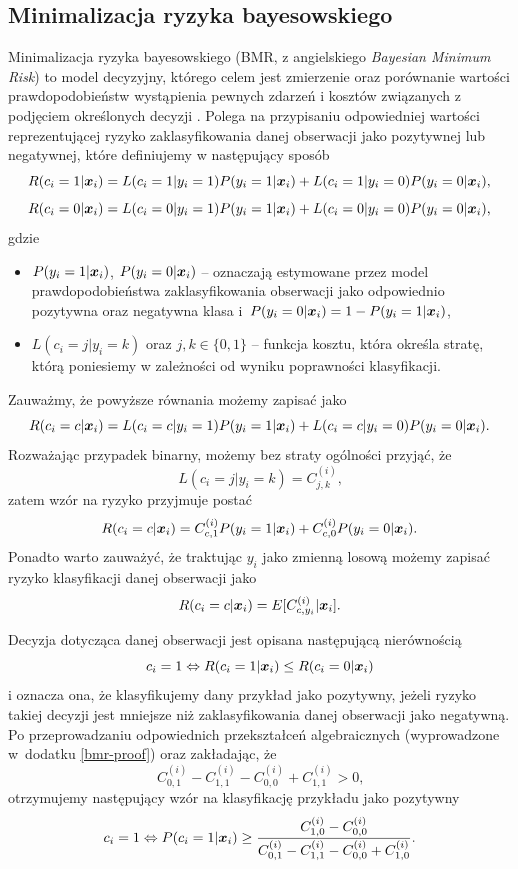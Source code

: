 \documentclass[inzynierska]{pwr_wmat_praca_dyplomowa}
\theoremstyle{plain}
\numberwithin{theorem}{chapter}
\theoremstyle{definition}
\numberwithin{theorem}{chapter}
\begin{document}
\subsection{Minimalizacja ryzyka bayesowskiego}
\label{bmr}
Minimalizacja ryzyka bayesowskiego (BMR, z angielskiego \textit{Bayesian Minimum Risk}) to model decyzyjny, którego celem jest zmierzenie oraz porównanie wartości prawdopodobieństw wystąpienia pewnych zdarzeń i kosztów związanych z podjęciem określonych decyzji  \cite{CSCCFD}. Polega na przypisaniu odpowiedniej wartości reprezentującej ryzyko zaklasyfikowania danej obserwacji jako pozytywnej lub negatywnej, które definiujemy w następujący sposób
$$ R(c_i = 1|\boldsymbol{x}_{i}) = L(c_i = 1|y_i = 1)P(y_i = 1|\boldsymbol{x}_{i}) + L(c_i = 1|y_i = 0)P(y_i = 0|\boldsymbol{x}_{i}) \text{,}$$
$$ R(c_i = 0|\boldsymbol{x}_{i}) = L(c_i = 0|y_i = 1)P(y_i = 1|\boldsymbol{x}_{i}) + L(c_i = 0|y_i = 0)P(y_i = 0|\boldsymbol{x}_{i}) \text{,}$$
gdzie
\begin{itemize}
	\item $P(y_i = 1|\boldsymbol{x}_{i})$, $P(y_i = 0|\boldsymbol{x}_{i})$ -- oznaczają estymowane przez model prawdopodobieństwa zaklasyfikowania obserwacji jako odpowiednio pozytywna oraz negatywna klasa i~$P(y_i = 0|\boldsymbol{x}_{i}) = 1 - P(y_i = 1|\boldsymbol{x}_{i})$,
	\item $L(c_i = j|y_i = k)$ oraz $j,k \in \{0, 1\}$ -- funkcja kosztu, która określa stratę, którą poniesiemy w zależności od wyniku poprawności klasyfikacji.
\end{itemize}{}
Zauważmy, że powyższe równania możemy zapisać jako
$$ R(c_i = c|\boldsymbol{x}_{i}) = L(c_i = c|y_i = 1)P(y_i = 1|\boldsymbol{x}_{i}) + L(c_i = c|y_i = 0)P(y_i = 0|\boldsymbol{x}_{i})\text{.} $$
Rozważając przypadek binarny, możemy bez straty ogólności przyjąć, że
$$ L(c_i = j|y_i = k) = C_{j, k}^{(i)} \text{,}$$
zatem wzór na ryzyko przyjmuje postać
$$ R(c_i = c|\boldsymbol{x}_{i}) = C_{c, 1}^{(i)}P(y_i = 1|\boldsymbol{x}_{i}) + C_{c, 0}^{(i)}P(y_i = 0|\boldsymbol{x}_{i})\text{.} $$
Ponadto warto zauważyć, że traktując $y_i$ jako zmienną losową możemy zapisać ryzyko klasyfikacji danej obserwacji jako
$$ R(c_i = c|\boldsymbol{x}_{i}) = E[C_{c, y_i}^{(i)} | \boldsymbol{x}_{i}] \text{.}$$

Decyzja dotycząca danej obserwacji jest opisana następującą nierównością
$$ c_i = 1 \Leftrightarrow R(c_i = 1|\boldsymbol{x}_{i}) \leq R(c_i = 0|\boldsymbol{x}_{i})$$
i oznacza ona, że klasyfikujemy dany przykład jako pozytywny, jeżeli ryzyko takiej decyzji jest mniejsze niż zaklasyfikowania danej obserwacji jako negatywną. 
Po przeprowadzaniu odpowiednich przekształceń algebraicznych (wyprowadzone w~dodatku \ref{bmr-proof}) oraz zakładając, że 
$$ C_{0, 1}^{(i)} - C_{1, 1}^{(i)} - C_{0, 0}^{(i)} + C_{1, 1}^{(i)} > 0 \text{,}$$ 
otrzymujemy następujący wzór na klasyfikację przykładu jako pozytywny
$$ c_i = 1 \Leftrightarrow P(c_i = 1|\boldsymbol{x}_{i}) \ge \frac{C^{(i)}_{1,0} - C^{(i)}_{0,0}}{C^{(i)}_{0,1} - C^{(i)}_{1,1} - C^{(i)}_{0,0} + C^{(i)}_{1,0}} \text{.}$$
\end{document}

